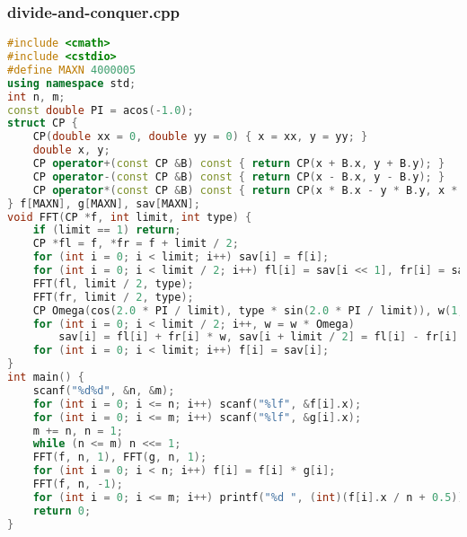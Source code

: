 \documentclass[9pt, a4paper, oneside]{book}
\begin{document}
\subsubsection{divide-and-conquer.cpp}
\begin{lstlisting}[language={C++}]
#include <cmath>
#include <cstdio>
#define MAXN 4000005
using namespace std;
int n, m;
const double PI = acos(-1.0);
struct CP {
    CP(double xx = 0, double yy = 0) { x = xx, y = yy; }
    double x, y;
    CP operator+(const CP &B) const { return CP(x + B.x, y + B.y); }
    CP operator-(const CP &B) const { return CP(x - B.x, y - B.y); }
    CP operator*(const CP &B) const { return CP(x * B.x - y * B.y, x * B.y + y * B.x); }
} f[MAXN], g[MAXN], sav[MAXN];
void FFT(CP *f, int limit, int type) {
    if (limit == 1) return;
    CP *fl = f, *fr = f + limit / 2;
    for (int i = 0; i < limit; i++) sav[i] = f[i];
    for (int i = 0; i < limit / 2; i++) fl[i] = sav[i << 1], fr[i] = sav[i << 1 | 1];
    FFT(fl, limit / 2, type);
    FFT(fr, limit / 2, type);
    CP Omega(cos(2.0 * PI / limit), type * sin(2.0 * PI / limit)), w(1, 0);
    for (int i = 0; i < limit / 2; i++, w = w * Omega)
        sav[i] = fl[i] + fr[i] * w, sav[i + limit / 2] = fl[i] - fr[i] * w;
    for (int i = 0; i < limit; i++) f[i] = sav[i];
}
int main() {
    scanf("%d%d", &n, &m);
    for (int i = 0; i <= n; i++) scanf("%lf", &f[i].x);
    for (int i = 0; i <= m; i++) scanf("%lf", &g[i].x);
    m += n, n = 1;
    while (n <= m) n <<= 1;
    FFT(f, n, 1), FFT(g, n, 1);
    for (int i = 0; i < n; i++) f[i] = f[i] * g[i];
    FFT(f, n, -1);
    for (int i = 0; i <= m; i++) printf("%d ", (int)(f[i].x / n + 0.5));
    return 0;
}\end{lstlisting}
\end{document}
